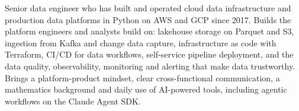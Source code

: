 
\begin{cvparagraph}

Senior data engineer who has built and operated cloud data infrastructure and production data platforms in Python on AWS and GCP since 2017. Builds the platform engineers and analysts build on: lakehouse storage on Parquet and S3, ingestion from Kafka and change data capture, infrastructure as code with Terraform, CI/CD for data workflows, self-service pipeline deployment, and the data quality, observability, monitoring and alerting that make data trustworthy. Brings a platform-product mindset, clear cross-functional communication, a mathematics background and daily use of AI-powered tools, including agentic workflows on the Claude Agent SDK.

\end{cvparagraph}
